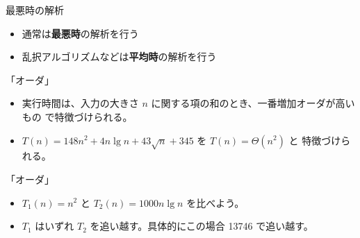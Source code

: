 \documentclass[unicode,11pt,aspectratio=169,hide notes]{beamer} %
\begin{document}
\begin{frame}{最悪時の解析}
  \begin{itemize}
    \item 通常は\textbf{最悪時}の解析を行う
    \item 乱択アルゴリズムなどは\textbf{平均時}の解析を行う
  \end{itemize}
\end{frame}


\begin{frame}{「オーダ」}
  \begin{itemize}
    \item 実行時間は、入力の大きさ $n$ に関する項の和のとき、一番増加オーダが高いもの
    で特徴づけられる。
    \item $T(n) = 148n^2 + 4n\lg n + 43\sqrt{n} + 345$ を $T(n) = \Theta(n^2)$ と
    特徴づけられる。
  \end{itemize}
\end{frame}


\begin{frame}{「オーダ」}
  \begin{itemize}
    \item<1-> $T_1(n) = n^2$ と $T_2(n) = 1000n\lg n$ を比べよう。
    \item<2-> $T_1$ はいずれ $T_2$ を追い越す。具体的にこの場合 13746 で追い越す。
  \end{itemize}
\end{frame}

\end{document}
